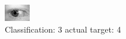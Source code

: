 \begin{figure}[h!]
\begin{center}
\includegraphics[width=0.60\columnwidth]{figures/ID748_class_3_target_4.png}
\end{center}
\caption{ Classification: 3 actual target: 4}
\label{fig:ID748_class_3_target_4}
\end{figure}
